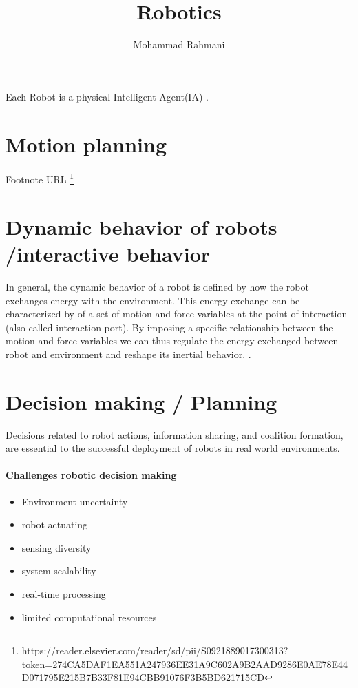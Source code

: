 \documentclass{article}
\begin{document}
	
	\title{Robotics}
	\author{Mohammad Rahmani}
	\date{}
	\maketitle
	Each Robot is a physical Intelligent Agent(IA) \citep{rizk-2018-decision-making-in-multiagent-systems-a-survey}.  
	
    \section{Motion planning}
    	
    	Footnote URL \footnote{https://reader.elsevier.com/reader/sd/pii/S0921889017300313?token=274CA5DAF1EA551A247936EE31A9C602A9B2AAD9286E0AE78E44D071795E215B7B33F81E94CBB91076F3B5BD621715CD}
    \section{Dynamic behavior of robots /interactive behavior}
    	In general, the dynamic behavior of a robot is defined by how the robot exchanges energy with the environment. This energy
    	exchange can be characterized by of a set of motion and force variables at the point of interaction (also called interaction
    	port). By imposing a specific relationship between the motion and force variables we can thus regulate the energy
    	exchanged between robot and environment and reshape its inertial behavior. \cite{tagliabue-2017-robust-collaborative-object-transportation-using-multiple-mavs}. 
    \section{Decision making / Planning} 
    	Decisions related to robot actions, information sharing, and coalition formation, are essential to the successful deployment of robots in real world environments.
    	
    	\paragraph{Challenges robotic decision making}
    		\begin{itemize}
    			\item Environment uncertainty
    			\item robot actuating
    			\item sensing diversity
    			\item system scalability
    			\item real-time processing
    			\item limited computational resources
    		\end{itemize}
\end{document}
